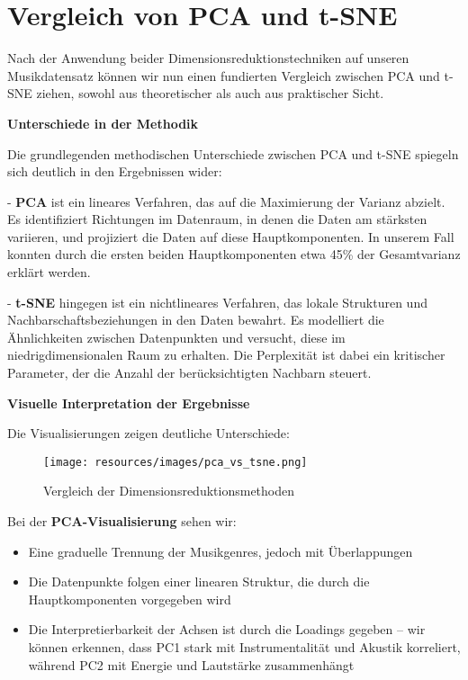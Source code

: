 \section{Vergleich von PCA und t-SNE}

Nach der Anwendung beider Dimensionsreduktionstechniken auf unseren Musikdatensatz können wir nun einen fundierten Vergleich zwischen PCA und t-SNE ziehen, sowohl aus theoretischer als auch aus praktischer Sicht.

\textbf{Unterschiede in der Methodik}

Die grundlegenden methodischen Unterschiede zwischen PCA und t-SNE spiegeln sich deutlich in den Ergebnissen wider:

- \textbf{PCA} ist ein lineares Verfahren, das auf die Maximierung der Varianz abzielt. Es identifiziert Richtungen im Datenraum, in denen die Daten am stärksten variieren, und projiziert die Daten auf diese Hauptkomponenten. In unserem Fall konnten durch die ersten beiden Hauptkomponenten etwa 45\% der Gesamtvarianz erklärt werden.

- \textbf{t-SNE} hingegen ist ein nichtlineares Verfahren, das lokale Strukturen und Nachbarschaftsbeziehungen in den Daten bewahrt. Es modelliert die Ähnlichkeiten zwischen Datenpunkten und versucht, diese im niedrigdimensionalen Raum zu erhalten. Die Perplexität ist dabei ein kritischer Parameter, der die Anzahl der berücksichtigten Nachbarn steuert.

\textbf{Visuelle Interpretation der Ergebnisse}

Die Visualisierungen zeigen deutliche Unterschiede:

\begin{figure}[H]
    \centering
    \texttt{[image: resources/images/pca\_vs\_tsne.png]}
    \caption{Vergleich der Dimensionsreduktionsmethoden}
\end{figure}

Bei der \textbf{PCA-Visualisierung} sehen wir:
\begin{itemize}
    \item Eine graduelle Trennung der Musikgenres, jedoch mit Überlappungen
    \item Die Datenpunkte folgen einer linearen Struktur, die durch die Hauptkomponenten vorgegeben wird
    \item Die Interpretierbarkeit der Achsen ist durch die Loadings gegeben – wir können erkennen, dass PC1 stark mit Instrumentalität und Akustik korreliert, während PC2 mit Energie und Lautstärke zusammenhängt
\end{itemize}

